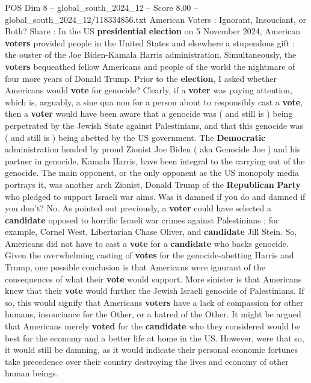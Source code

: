 \begin{textsample}{POS Dim 8 – global\_south\_2024\_12 – Score 8.00 – global\_south\_2024\_12/118334856.txt}  \label{ex:f8_pos_350}
American Voters : Ignorant, Insouciant, or Both?
Share : In the US \textbf{presidential} \textbf{election} on 5 November 2024, American \textbf{voters} provided people in the United States and elsewhere a stupendous gift : the ouster of the Joe Biden-Kamala Harris administration.
Simultaneously, the \textbf{voters} bequeathed fellow Americans and people of the world the nightmare of four more years of Donald Trump.
Prior to the \textbf{election}, I asked whether Americans would \textbf{vote} for genocide?
Clearly, if a \textbf{voter} was paying attention, which is, arguably, a sine qua non for a person about to responsibly cast a \textbf{vote}, then a \textbf{voter} would have been aware that a genocide was ( and still is ) being perpetrated by the Jewish State against Palestinians, and that this genocide was ( and still is ) being abetted by the US government.
The \textbf{Democratic} administration headed by proud Zionist Joe Biden ( aka Genocide Joe ) and his partner in genocide, Kamala Harris, have been integral to the carrying out of the genocide.
The main opponent, or the only opponent as the US monopoly media portrays it, was another arch Zionist, Donald Trump of the \textbf{Republican} \textbf{Party} who pledged to support Israeli war aims.
Was it damned if you do and damned if you don't?
No.
As pointed out previously, a \textbf{voter} could have selected a \textbf{candidate} opposed to horrific Israeli war crimes against Palestinians ; for example, Cornel West, Libertarian Chase Oliver, and \textbf{candidate} Jill Stein.
So, Americans did not have to cast a \textbf{vote} for a \textbf{candidate} who backs genocide.
Given the overwhelming casting of \textbf{votes} for the genocide-abetting Harris and Trump, one possible conclusion is that Americans were ignorant of the consequences of what their \textbf{vote} would support.
More sinister is that Americans knew that their \textbf{vote} would further the Jewish Israeli genocide of Palestinians.
If so, this would signify that Americans \textbf{voters} have a lack of compassion for other humans, insouciance for the Other, or a hatred of the Other.
It might be argued that Americans merely \textbf{voted} for the \textbf{candidate} who they considered would be best for the economy and a better life at home in the US.
However, were that so, it would still be damning, as it would indicate their personal economic fortunes take precedence over their country destroying the lives and economy of other human beings.

\end{textsample}
